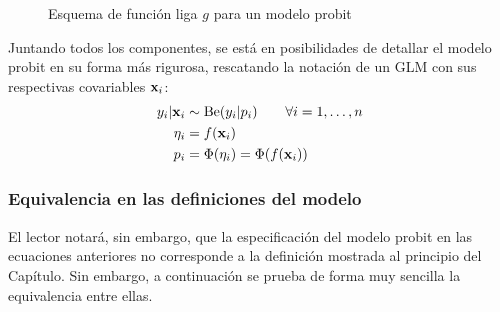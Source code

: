 \documentclass[../Main/Main.tex]{subfiles}
\begin{document}
\begin{figure}[h]
\centering
{}
\caption{Esquema de función liga $g$ para un modelo probit}
\label{fig:DiagramaFuncLiga}
\end{figure}

Juntando todos los componentes, se está en posibilidades de detallar el modelo probit en su forma más rigurosa, rescatando la notación de un GLM con sus respectivas covariables $\mathbf{x}_i$: 
\begin{align}
y_i|\mathbf{x}_i & \sim \text{Be}(y_i|p_i) \qquad \forall i = 1,\ldots,n\label{ec:ModProbitA}\\
\eta_i &= f(\mathbf{x}_i) \label{ec:ModProbitB} \\
p_i &= \Phi(\eta_i) = \Phi(f(\mathbf{x}_i)) \label{ec:ModProbitC}
\end{align}

\subsubsection*{Equivalencia en las definiciones del modelo}
El lector notará, sin embargo, que la especificación del modelo probit en las ecuaciones anteriores no corresponde a la definición mostrada al principio del Capítulo. Sin embargo, a continuación se prueba de forma muy sencilla la equivalencia entre ellas.\\
\end{document}
